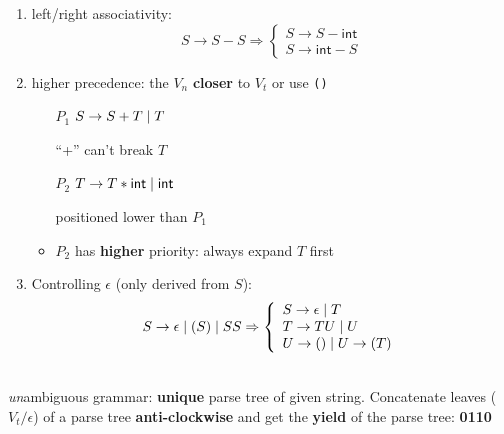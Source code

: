 \begin{minipage}{0.45\linewidth}
\setlength{\abovedisplayskip}{0pt}
\setlength{\belowdisplayskip}{0pt}
\begin{enumerate}
\item left/right associativity:
  \[
    S \rightarrow S - S \Rightarrow\left\{
      \begin{array}{l}
        S \rightarrow S - \mathsf{int} \\
        S \rightarrow \mathsf{int} - S
      \end{array}
       \right.
  \]
\item higher precedence: the \(V_{n}\) \textbf{closer} to \(V_{t}\) or use \verb|()|
  \begin{itemize}[leftmargin=1.5em]
    \item[$P_{1}$] \(S \rightarrow S + T \;|\; T\)
    \item[] ``+'' can't break \(T\)
    \item[$P_{2}$] \(T \rightarrow T * \mathsf{int} \;|\; \mathsf{int}\)
    \item[] positioned lower than \(P_{1}\)
    \item \(P_{2}\) has \textbf{higher} priority: always expand \(T\) first
    \end{itemize}
\item Controlling \(\epsilon\) (only derived from \(S\)):
  \[
    S \rightarrow \epsilon \;|\; (S) \;|\; SS \Rightarrow\left\{
        \begin{array}{l}
          S \rightarrow \epsilon \;|\; T\\
          T \rightarrow TU \;|\; U\\
          U \rightarrow () \;|\; U \rightarrow (T)
        \end{array}
      \right.
  \]
\end{enumerate}
\end{minipage}
\begin{minipage}[t]{0.45\linewidth}
  \centering
{}\\
\emph{un}ambiguous grammar: \textbf{unique} parse tree of given string.  Concatenate leaves (\(V_{t}/\epsilon\)) of a parse tree \textbf{anti-clockwise} and get the \textbf{yield} of the parse tree: \textbf{0110}
\end{minipage}
